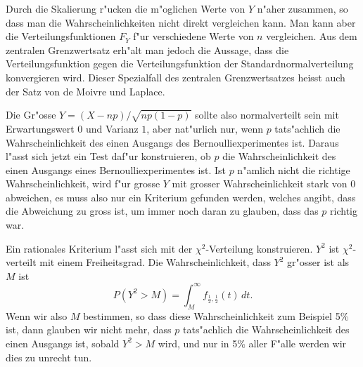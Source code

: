 Durch die Skalierung r"ucken die m"oglichen Werte von $Y$ n"aher zusammen,
so dass man die Wahrscheinlichkeiten nicht direkt vergleichen kann.
Man kann aber die Verteilungsfunktionen $F_Y$ f"ur verschiedene Werte
von $n$ vergleichen.
Aus dem zentralen Grenzwertsatz erh"alt man
jedoch die Aussage, dass die Verteilungsfunktion gegen die
Verteilungsfunktion der Standardnormalverteilung konvergieren wird.
Dieser Spezialfall des zentralen Grenzwertsatzes heisst auch der
Satz von de Moivre und Laplace.

Die Gr"osse $Y=(X-np)/\sqrt{np(1-p)}$ sollte also normalverteilt sein
mit Erwartungswert $0$ und Varianz $1$, aber nat"urlich nur, wenn $p$
tats"achlich die Wahrscheinlichkeit des einen Ausgangs des
Bernoulliexperimentes ist.
Daraus l"asst sich jetzt ein Test daf"ur
konstruieren, ob $p$ die Wahrscheinlichkeit des einen Ausgangs eines
Bernoulliexperimentes ist.
Ist $p$ n"amlich nicht die richtige
Wahrscheinlichkeit, wird f"ur grosse $Y$ mit grosser Wahrscheinlichkeit
stark von $0$ abweichen, es muss also nur ein Kriterium gefunden werden,
welches angibt, dass die Abweichung zu gross ist, um immer noch daran
zu glauben, dass das $p$ richtig war.

Ein rationales Kriterium l"asst sich mit der $\chi^2$-Verteilung konstruieren.
$Y^2$ ist $\chi^2$-verteilt mit einem Freiheitsgrad.
Die Wahrscheinlichkeit, dass $Y^2$ gr"osser ist als $M$ ist
\[
P(Y^2>M)=\int_M^\infty f_{\frac12,\frac12}(t)\,dt.
\]
Wenn wir also $M$ bestimmen, so dass diese Wahrscheinlichkeit 
zum Beispiel 5\% ist, dann glauben wir nicht mehr, dass $p$ tats"achlich
die Wahrscheinlichkeit des einen Ausgangs ist, sobald $Y^2>M$ wird,
und nur in 5\% aller F"alle werden wir dies zu unrecht tun.
